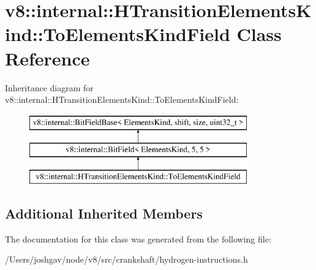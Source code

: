 \hypertarget{classv8_1_1internal_1_1_h_transition_elements_kind_1_1_to_elements_kind_field}{}\section{v8\+:\+:internal\+:\+:H\+Transition\+Elements\+Kind\+:\+:To\+Elements\+Kind\+Field Class Reference}
\label{classv8_1_1internal_1_1_h_transition_elements_kind_1_1_to_elements_kind_field}
Inheritance diagram for v8\+:\+:internal\+:\+:H\+Transition\+Elements\+Kind\+:\+:To\+Elements\+Kind\+Field\+:\begin{figure}[H]
\begin{center}
\leavevmode
\includegraphics[height=3.000000cm]{classv8_1_1internal_1_1_h_transition_elements_kind_1_1_to_elements_kind_field}
\end{center}
\end{figure}
\subsection*{Additional Inherited Members}


The documentation for this class was generated from the following file\+:\begin{DoxyCompactItemize}
\item 
/\+Users/joshgav/node/v8/src/crankshaft/hydrogen-\/instructions.\+h\end{DoxyCompactItemize}
